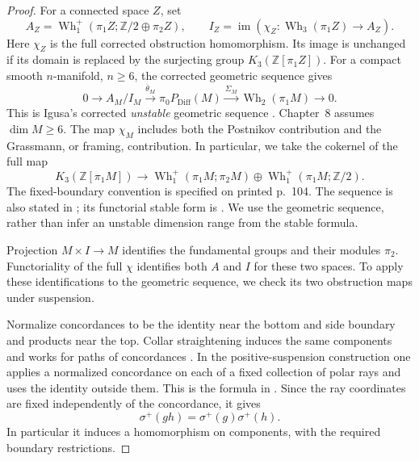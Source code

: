 \begin{proof}
For a connected space $Z$, set
\[
 A_Z=\operatorname{Wh}_1^+
       (\pi_1Z;\mathbb Z/2\oplus\pi_2Z),\qquad
 I_Z=\operatorname{im}(\chi_Z:\operatorname{Wh}_3(\pi_1Z)\to A_Z).
\]
Here $\chi_Z$ is the full corrected obstruction homomorphism.  Its
image is unchanged if its domain is replaced by the surjecting group
$K_3(\mathbb Z[\pi_1Z])$.
For a compact smooth $n$-manifold, $n\geq6$, the corrected geometric
sequence gives
\begin{equation}\label{eq:full-geometric-concordance-sequence}
 0\longrightarrow A_M/I_M\xrightarrow{\overline\theta_M}
 \pi_0P_{\mathrm{Diff}}(M)\xrightarrow{\Sigma_M}
 \operatorname{Wh}_2(\pi_1M)\longrightarrow0.
\end{equation}
This is Igusa's corrected \emph{unstable} geometric sequence
\cite[Section~8.a and Theorem~8.a.2, pp.~149--150]{Igusa1984}.
Chapter~8 assumes $\dim M\geq6$. The map $\chi_M$ includes both
the Postnikov contribution and the Grassmann, or framing,
contribution. In particular, we take the cokernel of the full map
\[
 K_3(\mathbb Z[\pi_1M])\longrightarrow
 \operatorname{Wh}_1^+(\pi_1M;\pi_2M)
 \oplus\operatorname{Wh}_1^+(\pi_1M;\mathbb Z/2).
\]
The fixed-boundary convention is specified on printed p.~104.
The sequence is also stated in
\cite[Theorem~3.1, p.~6]{Igusa2021Dimension3}; its functorial stable
form is \cite[Corollary~2.7, p.~250]{Jahren2010}. We use the
geometric sequence, rather than infer an unstable dimension range
from the stable formula.

Projection $M\times I\to M$ identifies the fundamental groups and their
modules $\pi_2$.  Functoriality of the full $\chi$ identifies both $A$
and $I$ for these two spaces.  To apply these identifications to the
geometric sequence, we check its two obstruction maps under suspension.

Normalize concordances to be the identity near the bottom and side
boundary and products near the top.  Collar straightening induces the
same components and works for paths of concordances
\cite[Part~I, Chapter~I, Section~5, p.~55]{HatcherWagoner1973}.
In the positive-suspension construction one applies a normalized
concordance on each of a fixed collection of polar rays and uses the
identity outside them.  This is the formula in
\cite[Section~4.1, p.~8]{Igusa2021Dimension3}.  Since the ray coordinates
are fixed independently of the concordance, it gives
\[
                    \sigma^+(gh)=\sigma^+(g)\sigma^+(h).
\]
In particular it induces a homomorphism on components, with the required
boundary restrictions.


\end{proof}
